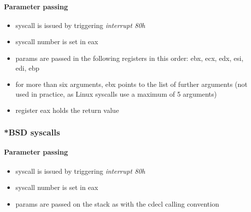 \paragraph{Parameter passing}

\begin{itemize}
\item syscall is issued by triggering {\em interrupt 80h}
\item syscall number is set in eax
\item params are passed in the following registers in this order: ebx, ecx, edx, esi, edi, ebp
\item for more than six arguments, ebx points to the list of further arguments (not used in practice, as Linux syscalls use a maximum of 5 arguments)
\item register eax holds the return value
\end{itemize}

\subsubsection{*BSD syscalls}

\paragraph{Parameter passing}

\begin{itemize}
\item syscall is issued by triggering {\em interrupt 80h}
\item syscall number is set in eax
\item params are passed on the stack as with the cdecl calling convention
\end{itemize}

